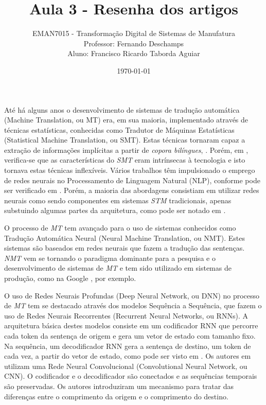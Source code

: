 \documentclass[a4paper]{article}
\title{
    Aula 3 - Resenha dos artigos\\
}
\author{
    {EMAN7015 - Transforma\c c\~ao Digital de Sistemas de Manufatura}\\
    \small{Professor: Fernando Deschamps}\\
    \small{Aluno: Francisco Ricardo Taborda Aguiar}\\    
}
\date{\today}
\begin{document}
    \maketitle

At\'e h\'a alguns anos o desenvolvimento de sistemas de tradu\c c\~ao autom\'atica 
(Machine Translation, ou MT) era, em sua maioria, implementado atrav\'es de t\'ecnicas 
estat\'isticas, conhecidas como Tradutor de M\'aquinas Estat\'isticas 
(Statistical Machine Translation, ou SMT).
Estas t\'ecnicas tornaram capaz a extra\c c\~ao de informa\c c\~oes impl\'icitas a partir de
\emph{copora bil\'ingues}, \cite{brown:1993}. Por\'em, em \textcite{maruf:2021}, verifica-se que 
as caracter\'isticas do \emph{SMT} eram intr\'insecas \`a tecnologia e isto tornava estas 
t\'ecnicas inflex\'iveis. V\'arios trabalhos t\^em impulsionado o emprego de redes 
neurais no Processamento de Linguagem Natural (NLP), conforme pode ser verificado em 
\textcite{goldberg:2016}. Por\'em, a maioria das abordagens consistiam em utilizar redes neurais 
como sendo componentes em sistemas \emph{STM} tradicionais, apenas substuindo algumas 
partes da arquitetura, como pode ser notado em \textcite{stahlberg:2020}.

O processo de \emph{MT} tem avan\c cado para o uso de sistemas conhecidos como Tradu\c c\~ao 
Autom\'atica Neural (Neural Machine Translation, ou NMT).
Estes sistemas s\~ao baseados em redes neurais que fazem a tradu\c c\~ao das senten\c cas.
\emph{NMT} vem se tornando o paradigma dominante para a pesquisa e o desenvolvimento 
de sistemas de \emph{MT} e tem sido utilizado em sistemas de produ\c c\~ao, como na Google
\cite{wu:2016}, por exemplo.

O uso de Redes Neurais Profundas (Deep Neural Network, ou DNN) no processo de \emph{MT}
tem se destacado atrav\'es dos modelos Sequ\^encia a Sequ\^encia, que fazem o uso de 
Redes Neurais Recorrentes (Recurrent Neural Networks, ou RNNs).
A arquitetura b\'asica destes modelos consiste em um codificador RNN que percorre cada 
token da senten\c ca de origem e gera um vetor de estado com tamanho fixo.
Na sequ\^encia, um decodificador RNN gera a senten\c ca de destino, um token de cada vez,
a partir do vetor de estado, como pode ser visto em \textcite{sutskever:2014}.
Os autores em \textcite{kalchbrenner:2016} utilizam uma Rede Neural Convolucional (Convolutional 
Neural Network, ou CNN). O codificador e o decodificador s\~ao conectados e as sequ\^encias 
temporais s\~ao preservadas. Os autores introduziram um mecanismo para tratar das 
diferen\c cas entre o comprimento da origem e o comprimento do destino.
\end{document}
